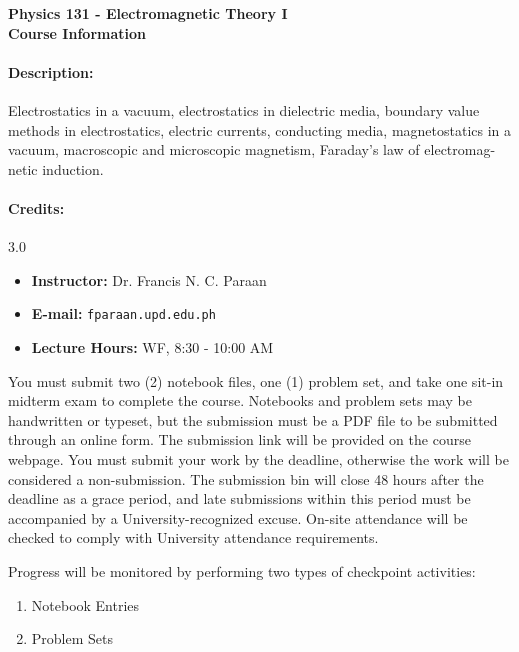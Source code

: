 
\begin{center}
	{
		\Large
		\textbf{Physics 131 - Electromagnetic Theory I\\[10pt] Course Information}
	}    
\end{center}

	\paragraph{Description: } 
	 
	Electrostatics in a vacuum, electrostatics in dielectric media, boundary value methods in
	electrostatics, electric currents, conducting media,
	magnetostatics in a vacuum, macroscopic and microscopic magnetism, Faraday’s law of electromag-
	netic induction.	

	\paragraph{Credits: } 3.0
	\begin{itemize}
		\item[] \textbf{Instructor: } Dr. Francis N. C. Paraan
		\item[] \textbf{E-mail: } \texttt{fparaan.upd.edu.ph}
		\item[] \textbf{Lecture Hours: } WF, 8:30 - 10:00 AM
	\end{itemize}

You must submit two (2) notebook files, one (1) problem set, and take one sit-in midterm exam to complete 
the course. Notebooks and problem sets may be handwritten or typeset, but the submission must be a PDF file 
to be submitted through an online form. The submission link will be provided on the course webpage. You
must submit your work by the deadline, otherwise the
work will be considered a non-submission. The submission bin will close 48 hours after the deadline as a grace
period, and late submissions within this period must be accompanied by a University-recognized excuse.
On-site attendance will be checked to comply with University attendance requirements.

Progress will be monitored by performing two types of
checkpoint activities:
\begin{enumerate}
    \item Notebook Entries
	\item Problem Sets
\end{enumerate}



